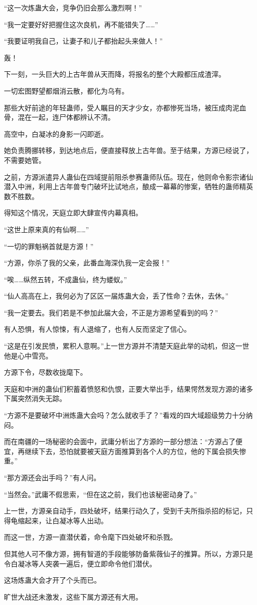 \begin{this_body}
“这一次炼蛊大会，竞争仍旧会那么激烈啊！”

“我一定要好好把握住这次良机，再不能错失了……”

“我要证明我自己，让妻子和儿子都抬起头来做人！”

轰！

下一刻，一头巨大的上古年兽从天而降，将报名的整个大殿都压成渣滓。

一切宏图野望都烟消云散，都化为乌有。

那些大好前途的年轻蛊师，受人瞩目的天才少女，亦都惨死当场，被压成肉泥血骨，混在一起，连尸体都辨认不清。

高空中，白凝冰的身影一闪即逝。

她负责腾挪转移，到达地点后，便直接释放上古年兽。至于结果，方源已经说了，不需要她管。

之前，方源派遣异人蛊仙在四域提前阻杀参赛蛊师队伍。现在，他则命令影宗诸仙潜入中洲，利用上古年兽专门破坏比试地点，酿成一幕幕的惨案，牺牲的蛊师精英数不胜数。

得知这个情况，天庭立即大肆宣传内幕真相。

“这世上原来真的有仙啊……”

“一切的罪魁祸首就是方源！”

“方源，你杀了我的父亲，此番血海深仇我一定会报！”

“唉……纵然五转，不成蛊仙，终为蝼蚁。”

“仙人高高在上，我何必为了区区一届炼蛊大会，丢了性命？去休，去休。”

“我一定要去。我们若是不参加此届大会，不正是方源希望看到的吗？”

有人恐惧，有人惊悚，有人退缩了，也有人反而坚定了信心。

“这是在引发民愤，累积人意啊。”上一世方源并不清楚天庭此举的动机，但这一世他是心中雪亮。

方源下令，尽数收拢麾下。

天庭和中洲的蛊仙们积蓄着愤怒和仇恨，正要大举出手，结果愕然发现方源的诸多下属突然消失无踪。

“方源不是要破坏中洲炼蛊大会吗？怎么就收手了？”看戏的四大域超级势力十分纳闷。

而在南疆的一场秘密的会面中，武庸分析出了方源的一部分想法：“方源占了便宜，再继续下去，恐怕就要被天庭方面推算到各个人的方位，他的下属会损失惨重。”

“那方源还会出手吗？”有人问。

“当然会。”武庸不假思索，“但在这之前，我们也该秘密动身了。”

上一世，方源亲自动手，四处破坏，结果行动久了，受到千夫所指杀招的标记，只得龟缩起来，让白凝冰等人出动。

而这一世，方源一直潜伏着，命令麾下四处破坏和杀戮。

但其他人可不像方源，拥有智道的手段能够防备紫薇仙子的推算。所以，方源只是令白凝冰等人突袭一遍后，便立即命令他们潜伏。

这场炼蛊大会才开了个头而已。

旷世大战还未激发，这些下属方源还有大用。

\end{this_body}

